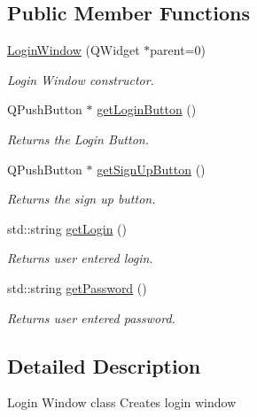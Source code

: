 \subsection*{Public Member Functions}
\begin{DoxyCompactItemize}
\item 
\mbox{\hyperlink{class_login_window_aacfb01de174b9eaf5a712bbfd4b6d9b5}{Login\+Window}} (Q\+Widget $\ast$parent=0)
\begin{DoxyCompactList}\small\item\em Login Window constructor. \end{DoxyCompactList}\item 
\mbox{\label{class_login_window_aca8271de7c4e99516ee30940767847f6}} 
Q\+Push\+Button $\ast$ \mbox{\hyperlink{class_login_window_aca8271de7c4e99516ee30940767847f6}{get\+Login\+Button}} ()
\begin{DoxyCompactList}\small\item\em Returns the Login Button. \end{DoxyCompactList}\item 
\mbox{\label{class_login_window_a837947cbea225ff915780d79bd2797df}} 
Q\+Push\+Button $\ast$ \mbox{\hyperlink{class_login_window_a837947cbea225ff915780d79bd2797df}{get\+Sign\+Up\+Button}} ()
\begin{DoxyCompactList}\small\item\em Returns the sign up button. \end{DoxyCompactList}\item 
std\+::string \mbox{\hyperlink{class_login_window_abb7c1af4eff6d4bcfcae122ee77089f1}{get\+Login}} ()
\begin{DoxyCompactList}\small\item\em Returns user entered login. \end{DoxyCompactList}\item 
std\+::string \mbox{\hyperlink{class_login_window_a708710b83651cfa427d8f213b6a1890e}{get\+Password}} ()
\begin{DoxyCompactList}\small\item\em Returns user entered password. \end{DoxyCompactList}\end{DoxyCompactItemize}


\subsection{Detailed Description}
Login Window class Creates login window 

